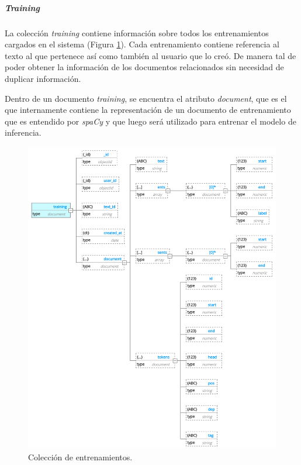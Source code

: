 \documentclass[12pt,a4paper,]{scrartcl}
\let\oldsubparagraph\subparagraph
\renewcommand{\subparagraph}[1]{\oldsubparagraph{#1}\mbox{}}
\begin{document}
\hypertarget{training}{%
\subparagraph{\texorpdfstring{\emph{Training}}{Training}}\label{training}}

La colección \emph{training} contiene información sobre todos los entrenamientos cargados en el sistema (Figura \ref{fig:developer-db-training}). Cada entrenamiento contiene referencia al texto al que pertenece así como también al usuario que lo creó. De manera tal de poder obtener la información de los documentos relacionados sin necesidad de duplicar información.

Dentro de un documento \emph{training}, se encuentra el atributo \emph{document}, que es el que internamente contiene la representación de un documento de entrenamiento que es entendido por \emph{spaCy} y que luego será utilizado para entrenar el modelo de inferencia.

\begin{figure}[H]

{\centering \includegraphics{assets/developer/db-training.pdf} 

}

\caption{Colección de entrenamientos.}\label{fig:developer-db-training}
\end{figure}
\end{document}
